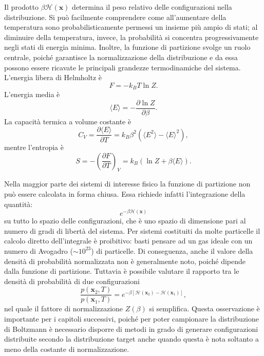 Il prodotto $\beta \mathcal{H}(\mathbf{x})$ determina il peso relativo delle configurazioni nella distribuzione. Si può facilmente comprendere come all'aumentare della temperatura sono probabilisticamente permessi un insieme più ampio di stati; al diminuire della temperatura, invece, la probabilità si concentra progressivamente negli stati di energia minima. Inoltre, la funzione di partizione svolge un ruolo centrale, poiché garantisce la normalizzazione della distribuzione e da essa possono essere ricavate le principali grandezze termodinamiche del sistema.
L'energia libera di Helmholtz è
\begin{equation}
F=-k_BT\ln Z.
\end{equation}
L'energia media è
\begin{equation}
\langle E\rangle
=
-\frac{\partial\ln Z}{\partial\beta}.
\end{equation}
La capacità termica a volume costante è
\begin{equation}
C_V
=
\frac{\partial\langle E\rangle}{\partial T}
=
k_B\beta^2
\left(
\langle E^2\rangle-\langle E\rangle^2
\right),
\end{equation}
mentre l'entropia è
\begin{equation}
S
=
-\left(
\frac{\partial F}{\partial T}
\right)_V
=
k_B(\ln Z+\beta\langle E\rangle).
\end{equation}

Nella maggior parte dei sistemi di interesse fisico la funzione di partizione non può essere calcolata in forma chiusa. Essa richiede infatti l'integrazione della quantità:
\begin{equation}
    e^{-\beta \mathcal{H}(\mathbf{x})}
\end{equation} su tutto lo spazio delle configurazioni, che è uno spazio di dimensione pari al numero di gradi di libertà del sistema. Per sistemi costituiti da molte particelle il calcolo diretto dell'integrale è proibitivo: basti pensare ad un gas ideale con un numero di Avogadro ($\sim 10^{23}$) di particelle. Di conseguenza, anche il valore della densità di probabilità normalizzata non è generalmente noto, poiché dipende dalla funzione di partizione. Tuttavia è possibile valutare il rapporto tra le densità di probabilità di due configurazioni
\begin{equation}
    \frac{p(\mathbf{x}_2, T)}{p(\mathbf{x}_1, T)} = e^{-\beta [\mathcal{H}(\mathbf{x}_2) - \mathcal{H}(\mathbf{x}_1)]},
\end{equation} nel quale il fattore di normalizzazione $Z(\beta)$ si semplifica. Questa osservazione è importante per i capitoli successivi, poiché per poter campionare la distribuzione di Boltzmann è necessario disporre di metodi in grado di generare configurazioni distribuite secondo la distribuzione target anche quando questa è nota soltanto a meno della costante di normalizzazione.

